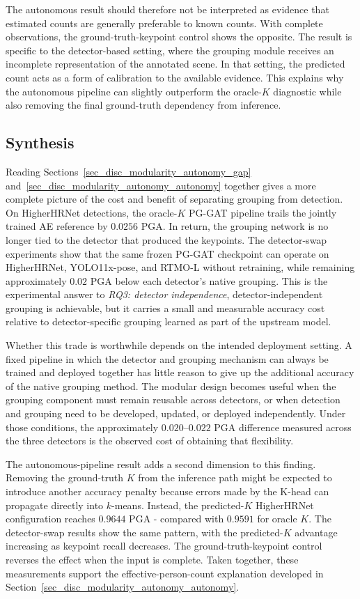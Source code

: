 The autonomous result should therefore not be interpreted as evidence
that estimated counts are generally preferable to known counts.
With complete observations, the ground-truth-keypoint control shows the
opposite.
The result is specific to the detector-based setting,
where the grouping module receives an incomplete representation of the
annotated scene.
In that setting, the predicted count acts as a form of calibration
to the available evidence.
This explains why the autonomous pipeline can slightly outperform the
oracle-$K$ diagnostic while also removing the final ground-truth
dependency from inference.


\subsection{Synthesis}
\label{sec_disc_modularity_autonomy_synthesis}

Reading Sections~\ref{sec_disc_modularity_autonomy_gap}
and~\ref{sec_disc_modularity_autonomy_autonomy} together gives a more
complete picture of the cost and benefit of separating grouping from
detection.
On HigherHRNet detections, the oracle-$K$ PG-GAT pipeline trails the
jointly trained AE reference by $0.0256$ PGA.
In return, the grouping network is no longer tied to the detector that
produced the keypoints.
The detector-swap experiments show that the same frozen PG-GAT
checkpoint can operate on HigherHRNet,
YOLO11x-pose,
and RTMO-L without retraining,
while remaining approximately $0.02$ PGA below each detector's native
grouping.
This is the experimental answer to \emph{RQ3: detector independence},
detector-independent grouping is achievable,
but it carries a small and measurable accuracy cost relative to
detector-specific grouping learned as part of the upstream model.

Whether this trade is worthwhile depends on the intended deployment
setting.
A fixed pipeline in which the detector and grouping mechanism can
always be trained and deployed together has little reason to give up
the additional accuracy of the native grouping method.
The modular design becomes useful when the grouping component must
remain reusable across detectors,
or when detection and grouping need to be developed,
updated,
or deployed independently.
Under those conditions, the approximately $0.020$--$0.022$ PGA
difference measured across the three detectors is the observed cost
of obtaining that flexibility.

The autonomous-pipeline result adds a second dimension to this finding.
Removing the ground-truth $K$ from the inference path might be expected
to introduce another accuracy penalty because errors made by the K-head
can propagate directly into $k$-means.
Instead, the predicted-$K$ HigherHRNet configuration reaches $0.9644$
PGA - compared with $0.9591$ for oracle $K$.
The detector-swap results show the same pattern,
with the predicted-$K$ advantage increasing as keypoint recall decreases.
The ground-truth-keypoint control reverses the effect when the input is
complete.
Taken together, these measurements support the effective-person-count
explanation developed in Section~\ref{sec_disc_modularity_autonomy_autonomy}.

